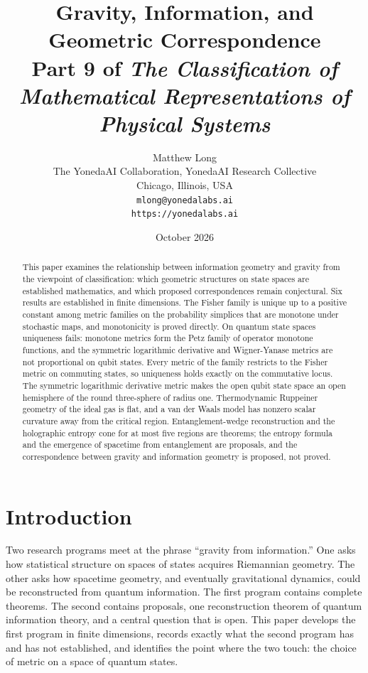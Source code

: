 \documentclass[11pt,letterpaper]{article}
\title{Gravity, Information, and Geometric Correspondence\\[4pt]
  {\normalsize Part 9 of \emph{The Classification of Mathematical Representations of Physical Systems}}}
\author{Matthew Long\\
  \small The YonedaAI Collaboration, YonedaAI Research Collective\\
  \small Chicago, Illinois, USA\\
  \small \texttt{mlong@yonedalabs.ai}\\
  \small \texttt{https://yonedalabs.ai}}
\date{October 2026}
\theoremstyle{definition}
\theoremstyle{remark}
\begin{document}
\maketitle

\begin{abstract}
This paper examines the relationship between information geometry and gravity from the viewpoint of classification: which geometric structures on state spaces are established mathematics, and which proposed correspondences remain conjectural. Six results are established in finite dimensions. The Fisher family is unique up to a positive constant among metric families on the probability simplices that are monotone under stochastic maps, and monotonicity is proved directly. On quantum state spaces uniqueness fails: monotone metrics form the Petz family of operator monotone functions, and the symmetric logarithmic derivative and Wigner-Yanase metrics are not proportional on qubit states. Every metric of the family restricts to the Fisher metric on commuting states, so uniqueness holds exactly on the commutative locus. The symmetric logarithmic derivative metric makes the open qubit state space an open hemisphere of the round three-sphere of radius one. Thermodynamic Ruppeiner geometry of the ideal gas is flat, and a van der Waals model has nonzero scalar curvature away from the critical region. Entanglement-wedge reconstruction and the holographic entropy cone for at most five regions are theorems; the entropy formula and the emergence of spacetime from entanglement are proposals, and the correspondence between gravity and information geometry is proposed, not proved.
\end{abstract}

\section{Introduction}

Two research programs meet at the phrase ``gravity from information.'' One asks how statistical structure on spaces of states acquires Riemannian geometry. The other asks how spacetime geometry, and eventually gravitational dynamics, could be reconstructed from quantum information. The first program contains complete theorems. The second contains proposals, one reconstruction theorem of quantum information theory, and a central question that is open. This paper develops the first program in finite dimensions, records exactly what the second program has and has not established, and identifies the point where the two touch: the choice of metric on a space of quantum states.
\end{document}
